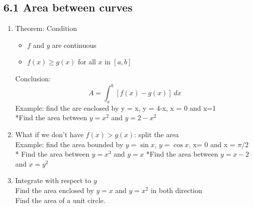 \documentclass{article}
\begin{document}
\subsection{6.1 Area between curves}
\begin{enumerate}
\item Theorem: Condition
\begin{itemize}
\item $f$ and $g$ are continuous
\item $f(x)\geq g(x)$ for all $x$ in $[a,b]$
\end{itemize}
Conclusion:
$$
A = \int_a^b[f(x)-g(x)]~dx
$$
Example: find the are enclosed by y = x, y = 4-x, x = 0 and x=1\\
*Find the area between $y = x^2$ and $y = 2-x^2$
\item What if we don't have $f(x)>g(x)$: split the area\\
Example: find the area bounded by $y = \sin x$, $y = \cos x$, x= 0 and x = $\pi/2$\\
* Find the area between $y = x^3$ and $y= x$
*Find the area between $y = x-2$ and $x = y^2$
\item Integrate with respect to $y $\\
Find the area enclosed by $y = x$ and $y = x^2$ in both direction\\
Find the area of a unit circle.
\end{enumerate}
\end{document}
